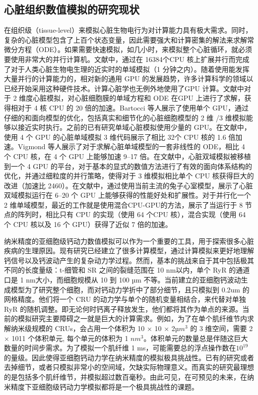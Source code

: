 \subsection{心脏组织数值模拟的研究现状}
在组织级（tissue-level）来模拟心脏生物电行为对计算能力具有极大需求。同时，复杂的心脏模型包含了上百个状态变量，因此需要强大和计算密集的解法来求解常微分方程（ODE）。如果需要快速模拟，如几小时，来模拟整个心脏循环，就必须要使用非常大的并行计算机。文献中，通过在 16384个CPU 核上扩展并行而完成了对于人类心脏生物电生理的近实时的单域模拟（1 分钟之内）。随着使用能发挥大量并行的计算能力的，相对新的通用 GPU 的发展趋势，许多计算科学的领域以已经开始采用这种硬件技术。计算心脏学也无例外地使用了GPU 计算。文献中对于 2 维度心脏模拟，对心脏细胞膜的单域方程和 ODE 在GPU 上进行了求解，获得相对于 4 核 CPU 的 20 倍的加速。Bartocci 等人展示了使用单个 GPU，通过仔细的和面向模型的优化，包括真实和细节化的心脏细胞模型的 2 维 /3 维模拟能够以接近实时执行。之前的已有研究单域心脏模拟使用少量的 GPU。在文献中，使用 4 个 GPU 的心脏单域模拟 3 维代码展示了相比 32个 CPU 核的 1.6 倍加速。Vigmond 等人展示了对于求解心脏单域模型的一套非线性的 ODE，相比 4 个 CPU 核，在 4 个 GPU 上能够加速 9–17 倍。在文献中，心脏双域模拟被移植到一个 4 GPU 的平台，对于基本的显式的数值方法进行了有效的面向体系结构的优化，并通过细粒度的并行策略，使得对于 3 维模拟相比单个 CPU 核获得巨大的改进（加速比 2460）。在文献中，通过使用当前主流的兔子心室模型，展示了心脏双域模拟运行在 6–20 个 GPU 上能够获得的性能好处和扩展性。对于并行化一个 2 维单域模型，最近的工作就是使用混合CPU-GPU的方法，展示了当运行于 8 节点的阵列时，相比只有 CPU 的实现（使用 64 个CPU 核），混合实现（使用 64 个 CPU 核以及 16 个 GPU）获得了近似 7 倍的加速。

 纳米精度的亚细胞级钙动力数值模拟可以作为一个重要的工具，用于探索很多心脏疾病的生理原因。现有研究已经建立了很多计算模型，通过计算模拟来更好地理解钙信号以及钙波动产生的复杂动力学过程。然而，基本的挑战来自于其中包括极其不同的长度量级：t-细管和 SR 之间的裂缝范围在 10 nm以内，单个 RyR 的通道口是 1 nm大小，而细胞规模从 10 到 100 µm 不等。当前建立的亚细胞钙波动生成模型为了研究整个细胞，而对钙动力学折中了部分细节，且只模拟到 0.2um 的网格精度。他们将一个 CRU 的动力学与单个的随机变量相结合，来代替对单独 RyR 的随机调整。即无论何时钙离子释放发生，他们都将其作为单点的来源。当前的模拟研究主要障碍之一就是巨大的计算需求。例如，为了在单个肌纤维节内求解纳米级规模的 CRUs，会占用一个体积为 10 × 10 × 2$µm^3$ 的 3 维空间，需要 2 × 1011 个体积单元, 每个单元的体积为 1 $nm^3$。体积单元的数量总是伴随这巨大数量的时间步需求。为了模拟一个肌纤维 1 ms，可能需要总的浮点操作数在$10^{19}$的量级。因此使得亚细胞钙动力学在纳米精度的模拟极具挑战性。已有的研究或者去掉细节，或者只模拟非常小的空间域，欠缺实际物理意义。而真实的研究最理想的是包括多个肌纤维节，并模拟超过数百毫秒。由此可见，在可预见的未来，在纳米精度下亚细胞级钙动力学模拟都将是一个极具挑战性的课题。

